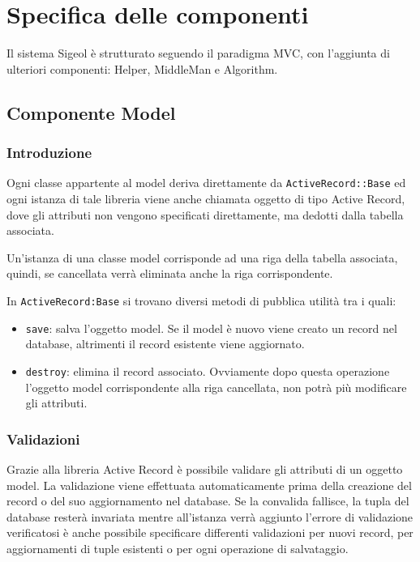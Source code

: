 \documentclass[11pt,a4paper]{article}
\begin{document}
\section{Specifica delle componenti}
Il sistema Sigeol è strutturato seguendo il paradigma MVC, con l'aggiunta di ulteriori componenti: Helper, MiddleMan e Algorithm.
\subsection{Componente Model}\label{model}
\subsubsection{Introduzione}
Ogni classe appartente al model deriva direttamente da \verb|ActiveRecord::Base| ed ogni istanza di tale libreria viene anche chiamata oggetto di tipo Active Record, dove gli attributi non vengono specificati direttamente, ma dedotti dalla tabella associata.

Un'istanza di una classe model corrisponde ad una riga della tabella associata, quindi, se cancellata verrà eliminata anche la riga corrispondente.

In \verb|ActiveRecord:Base| si trovano diversi metodi di pubblica utilità tra i quali:
\begin{itemize}
 \item \verb|save|: salva l'oggetto model. Se il model è nuovo viene creato un record nel database, altrimenti il record esistente viene aggiornato.
 \item \verb|destroy|: elimina il record associato. Ovviamente dopo questa operazione l'oggetto model corrispondente alla riga cancellata, non potrà più modificare gli attributi.
\end{itemize}
\subsubsection*{Validazioni}
Grazie alla libreria Active Record è possibile validare gli attributi di un oggetto model. La validazione viene effettuata automaticamente prima della creazione del record o del suo aggiornamento nel database. Se la convalida fallisce, la tupla del database resterà invariata mentre all'istanza verrà aggiunto l'errore di validazione verificatosi è anche possibile specificare differenti validazioni per nuovi record, per aggiornamenti di tuple esistenti o per ogni operazione di salvataggio.
\end{document}
